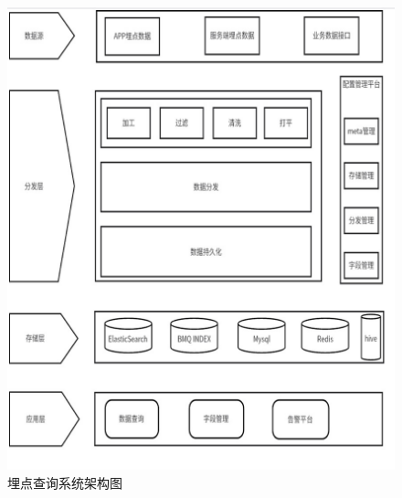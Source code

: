  \begin{figure}[htb]
  \centering
  \includegraphics[width=5in]{figure/chapter4/系统架构图.jpg}
  \caption{埋点查询系统架构图}\label{xitongjiagou}
\end{figure}

